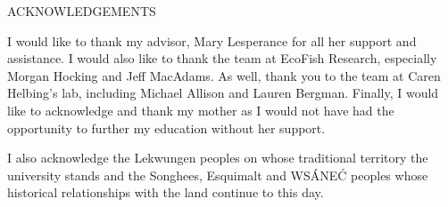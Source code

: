 \newpage


\begin{center}
ACKNOWLEDGEMENTS
\end{center}



I would like to thank my advisor, Mary Lesperance for all her support and assistance. I would also like to thank the team at EcoFish Research, especially Morgan Hocking and Jeff MacAdams. As well, thank you to the team at Caren Helbing's lab, including Michael Allison and Lauren Bergman. Finally, I would like to acknowledge and thank my mother as I would not have had the opportunity to further my education without her support. 

\vspace{5mm}

I also acknowledge the Lekwungen peoples on whose traditional territory the university stands and the Songhees, Esquimalt and WSÁNEĆ peoples whose historical relationships with the land continue to this day.